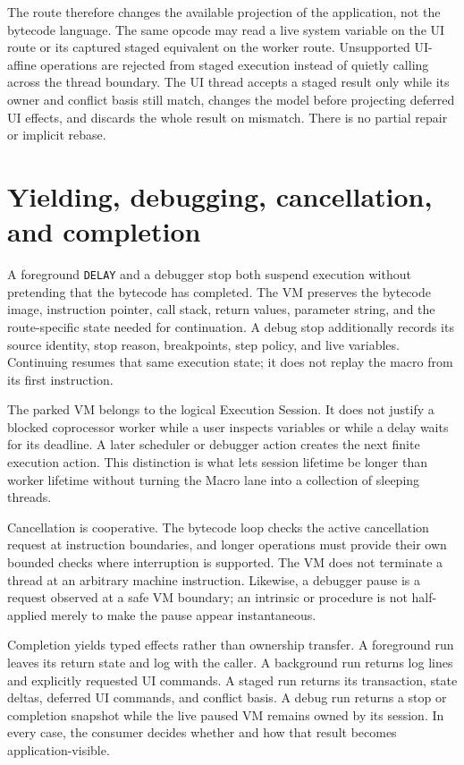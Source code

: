\documentclass[a4paper,10pt,twoside,openany]{book}
\begin{document}
The route therefore changes the available projection of the application, not
the bytecode language. The same opcode may read a live system variable on the
UI route or its captured staged equivalent on the worker route. Unsupported
UI-affine operations are rejected from staged execution instead of quietly
calling across the thread boundary. The UI thread accepts a staged result only
while its owner and conflict basis still match, changes the model before
projecting deferred UI effects, and discards the whole result on mismatch.
There is no partial repair or implicit rebase.

\section{Yielding, debugging, cancellation, and completion}

A foreground \texttt{DELAY} and a debugger stop both suspend execution without
pretending that the bytecode has completed. The VM preserves the bytecode
image, instruction pointer, call stack, return values, parameter string, and
the route-specific state needed for continuation. A debug stop additionally
records its source identity, stop reason, breakpoints, step policy, and live
variables. Continuing resumes that same execution state; it does not replay
the macro from its first instruction.

The parked VM belongs to the logical Execution Session. It does not justify a
blocked coprocessor worker while a user inspects variables or while a delay
waits for its deadline. A later scheduler or debugger action creates the next
finite execution action. This distinction is what lets session lifetime be
longer than worker lifetime without turning the Macro lane into a collection
of sleeping threads.

Cancellation is cooperative. The bytecode loop checks the active cancellation
request at instruction boundaries, and longer operations must provide their
own bounded checks where interruption is supported. The VM does not terminate
a thread at an arbitrary machine instruction. Likewise, a debugger pause is a
request observed at a safe VM boundary; an intrinsic or procedure is not
half-applied merely to make the pause appear instantaneous.

Completion yields typed effects rather than ownership transfer. A foreground
run leaves its return state and log with the caller. A background run returns
log lines and explicitly requested UI commands. A staged run returns its
transaction, state deltas, deferred UI commands, and conflict basis. A debug
run returns a stop or completion snapshot while the live paused VM remains
owned by its session. In every case, the consumer decides whether and how that
result becomes application-visible.
\end{document}
